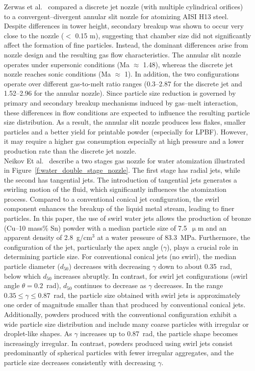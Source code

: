 \documentclass[../main]{subfiles}
\begin{document}
Zerwas et al.~\cite{Zerwas2024ImpactGas} compared a discrete jet nozzle (with multiple cylindrical orifices) to a convergent–divergent annular slit nozzle for atomizing AISI H13 steel. Despite differences in tower height, secondary breakup was shown to occur very close to the nozzle ($<$ 0.15 m), suggesting that chamber size did not significantly affect the formation of fine particles. Instead, the dominant differences arise from nozzle design and the resulting gas flow characteristics. The annular slit nozzle operates under supersonic conditions (Ma $\approx$  1.48), whereas the discrete jet nozzle reaches sonic conditions (Ma $\approx$  1). In addition, the two configurations operate over different gas-to-melt ratio ranges (0.3–2.87 for the discrete jet and 1.52–2.96 for the annular nozzle). Since particle size reduction is governed by primary and secondary breakup mechanisms induced by gas–melt interaction, these differences in flow conditions are expected to influence the resulting particle size distribution. As a result, the annular slit nozzle produces less flakes, smaller particles and a better yield for printable powder (especially for LPBF). However, it may require a higher gas consumption especially at high pressure and a lower production rate than the discrete jet nozzle.\\
Neikov Et al.~\cite{Neikov2009HandbookNonFerrous} describe a two stages gas nozzle for water atomization illustrated in Figure~\ref{f:water_double_stage_nozzle}. The first stage has radial jets, while the second has tangential jets. The introduction of tangential jets generates a swirling motion of the fluid, which significantly influences the atomization process. Compared to a conventional conical jet configuration, the swirl component enhances the breakup of the liquid metal stream, leading to finer particles. In this paper, the use of swirl water jets allows the production of bronze (Cu–10 mass\% Sn) powder with a median particle size of 7.5~$\upmu$m and an apparent density of 2.8~g/cm$^3$ at a water pressure of 83.3~MPa. Furthermore, the configuration of the jet, particularly the apex angle ($\gamma$), plays a crucial role in determining particle size. For conventional conical jets (no swirl), the median particle diameter ($d_{50}$) decreases with decreasing $\gamma$ down to about 0.35~rad, below which $d_{50}$ increases abruptly. In contrast, for swirl jet configurations (swirl angle $\theta = 0.2$~rad), $d_{50}$ continues to decrease as $\gamma$ decreases. In the range $0.35 \leq \gamma \leq 0.87$~rad, the particle size obtained with swirl jets is approximately one order of magnitude smaller than that produced by conventional conical jets. Additionally, powders produced with the conventional configuration exhibit a wide particle size distribution and include many coarse particles with irregular or droplet-like shapes. As $\gamma$ increases up to 0.87~rad, the particle shape becomes increasingly irregular. In contrast, powders produced using swirl jets consist predominantly of spherical particles with fewer irregular aggregates, and the particle size decreases consistently with decreasing $\gamma$.
\end{document}
